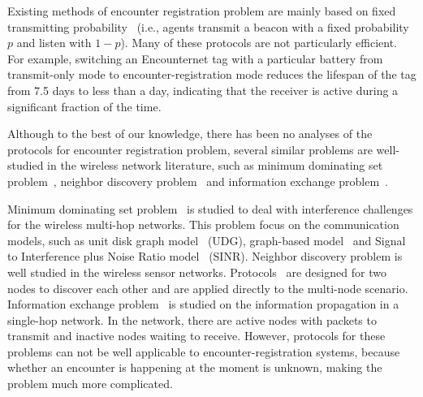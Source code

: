 Existing methods of encounter registration problem are mainly based on fixed transmitting 
probability~\cite{Menhill2012NovelTelemetry,Rutz2012AutomatedMapping}
(i.e., agents transmit a beacon with a fixed probability $p$ and listen with $1-p$). 
Many of these protocols are not particularly efficient. For example, switching 
an Encounternet tag with a particular battery from transmit-only mode 
to encounter-registration mode reduces the lifespan
of the tag from 7.5 days to less than a day, indicating that the 
receiver is active during a significant fraction of the time.

Although to the best of our knowledge, there has been no analyses of the protocols 
for encounter registration problem, several similar problems are well-studied 
in the wireless network literature, such as  
minimum dominating set problem~\cite{Scheideler2008An,Yu2013Review},
neighbor discovery problem~\cite{Bakht2012Searchlight, Sun2014Hello,Chen2015On}
and information exchange problem~\cite{Capetanakis1979Tree,Daum2013Maximal,Yu2017Uniform}.

Minimum dominating set problem~\cite{Scheideler2008An,Yu2013Review} is studied to 
deal with interference challenges for the wireless multi-hop networks.
This problem focus on the communication models, such as unit disk graph model~\cite{Lebhar2009Unit} (UDG),
graph-based model~\cite{De2007A} and Signal to Interference plus Noise Ratio model~\cite{Lee2007Signal} (SINR).
Neighbor discovery problem is well studied in the wireless sensor 
networks. Protocols~\cite{Bakht2012Searchlight, Sun2014Hello,Chen2015On} 
are designed for two nodes to discover each other and 
are applied directly to the multi-node scenario.
Information exchange problem~\cite{Capetanakis1979Tree,Daum2013Maximal,Yu2017Uniform} is 
studied on the information propagation in a single-hop network. 
In the network, there are active nodes with packets to transmit 
and inactive nodes waiting to receive.
However, protocols for these problems can not be well 
applicable to encounter-registration systems,
because whether an encounter is happening at the moment is unknown, 
making the problem much more complicated.


